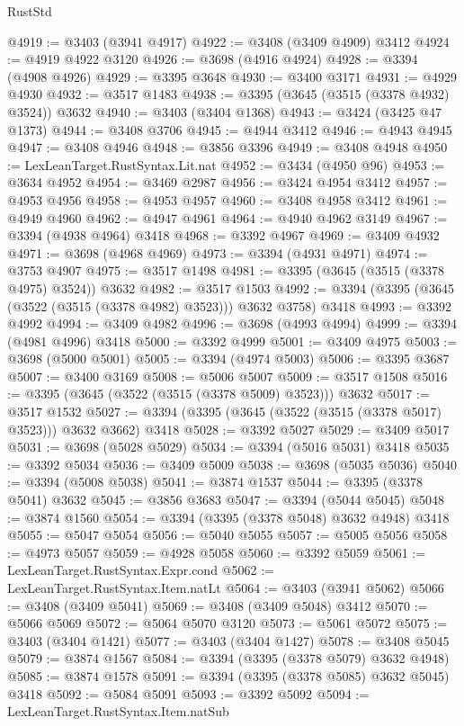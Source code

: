 \begin{lexlean}{RustStd}
\begin{coremodule}
@4919 := @3403 (@3941 @4917)
@4922 := @3408 (@3409 @4909) @3412
@4924 := @4919 @4922 @3120
@4926 := @3698 (@4916 @4924)
@4928 := @3394 (@4908 @4926)
@4929 := @3395 @3648
@4930 := @3400 @3171
@4931 := @4929 @4930
@4932 := @3517 @1483
@4938 := @3395 (@3645 (@3515 (@3378 @4932) @3524)) @3632
@4940 := @3403 (@3404 @1368)
@4943 := @3424 (@3425 @47 @1373)
@4944 := @3408 @3706
@4945 := @4944 @3412
@4946 := @4943 @4945
@4947 := @3408 @4946
@4948 := @3856 @3396
@4949 := @3408 @4948
@4950 := LexLeanTarget.RustSyntax.Lit.nat
@4952 := @3434 (@4950 @96)
@4953 := @3634 @4952
@4954 := @3469 @2987
@4956 := @3424 @4954 @3412
@4957 := @4953 @4956
@4958 := @4953 @4957
@4960 := @3408 @4958 @3412
@4961 := @4949 @4960
@4962 := @4947 @4961
@4964 := @4940 @4962 @3149
@4967 := @3394 (@4938 @4964) @3418
@4968 := @3392 @4967
@4969 := @3409 @4932
@4971 := @3698 (@4968 @4969)
@4973 := @3394 (@4931 @4971)
@4974 := @3753 @4907
@4975 := @3517 @1498
@4981 := @3395 (@3645 (@3515 (@3378 @4975) @3524)) @3632
@4982 := @3517 @1503
@4992 := @3394 (@3395 (@3645 (@3522 (@3515 (@3378 @4982) @3523))) @3632 @3758) @3418
@4993 := @3392 @4992
@4994 := @3409 @4982
@4996 := @3698 (@4993 @4994)
@4999 := @3394 (@4981 @4996) @3418
@5000 := @3392 @4999
@5001 := @3409 @4975
@5003 := @3698 (@5000 @5001)
@5005 := @3394 (@4974 @5003)
@5006 := @3395 @3687
@5007 := @3400 @3169
@5008 := @5006 @5007
@5009 := @3517 @1508
@5016 := @3395 (@3645 (@3522 (@3515 (@3378 @5009) @3523))) @3632
@5017 := @3517 @1532
@5027 := @3394 (@3395 (@3645 (@3522 (@3515 (@3378 @5017) @3523))) @3632 @3662) @3418
@5028 := @3392 @5027
@5029 := @3409 @5017
@5031 := @3698 (@5028 @5029)
@5034 := @3394 (@5016 @5031) @3418
@5035 := @3392 @5034
@5036 := @3409 @5009
@5038 := @3698 (@5035 @5036)
@5040 := @3394 (@5008 @5038)
@5041 := @3874 @1537
@5044 := @3395 (@3378 @5041) @3632
@5045 := @3856 @3683
@5047 := @3394 (@5044 @5045)
@5048 := @3874 @1560
@5054 := @3394 (@3395 (@3378 @5048) @3632 @4948) @3418
@5055 := @5047 @5054
@5056 := @5040 @5055
@5057 := @5005 @5056
@5058 := @4973 @5057
@5059 := @4928 @5058
@5060 := @3392 @5059
@5061 := LexLeanTarget.RustSyntax.Expr.cond
@5062 := LexLeanTarget.RustSyntax.Item.natLt
@5064 := @3403 (@3941 @5062)
@5066 := @3408 (@3409 @5041)
@5069 := @3408 (@3409 @5048) @3412
@5070 := @5066 @5069
@5072 := @5064 @5070 @3120
@5073 := @5061 @5072
@5075 := @3403 (@3404 @1421)
@5077 := @3403 (@3404 @1427)
@5078 := @3408 @5045
@5079 := @3874 @1567
@5084 := @3394 (@3395 (@3378 @5079) @3632 @4948)
@5085 := @3874 @1578
@5091 := @3394 (@3395 (@3378 @5085) @3632 @5045) @3418
@5092 := @5084 @5091
@5093 := @3392 @5092
@5094 := LexLeanTarget.RustSyntax.Item.natSub

\end{coremodule}
\end{lexlean}

